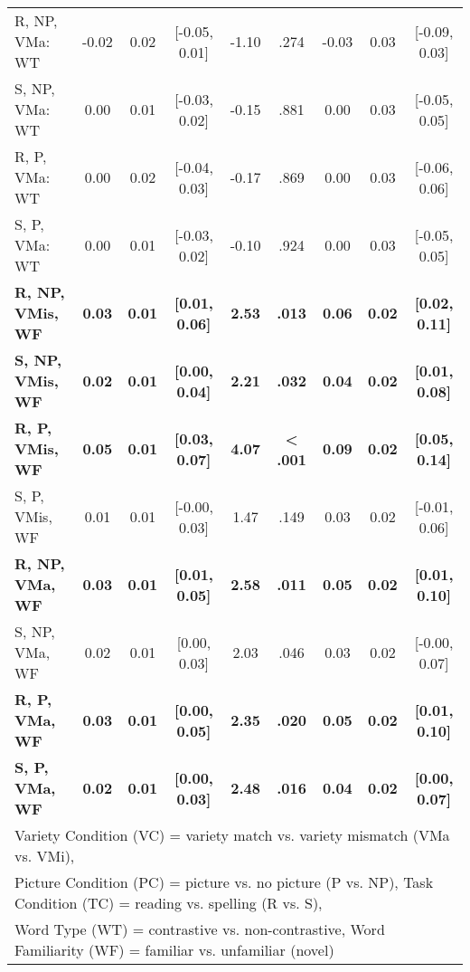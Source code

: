 \documentclass[doc,floatsintext]{apa6}
\begin{document}
\begin{table}[!h]
{\begin{tabular}{lcccccccc}
R, NP, VMa: WT & -0.02 & 0.02 & [-0.05, 0.01] & -1.10 & .274 & -0.03 & 0.03 & [-0.09, 0.03]\\
S, NP, VMa: WT & 0.00 & 0.01 & [-0.03, 0.02] & -0.15 & .881 & 0.00 & 0.03 & [-0.05, 0.05]\\
R, P, VMa: WT & 0.00 & 0.02 & [-0.04, 0.03] & -0.17 & .869 & 0.00 & 0.03 & [-0.06, 0.06]\\
S, P, VMa: WT & 0.00 & 0.01 & [-0.03, 0.02] & -0.10 & .924 & 0.00 & 0.03 & [-0.05, 0.05]\\
\textbf{R, NP, VMis, WF} & \textbf{0.03} & \textbf{0.01} & \textbf{[0.01, 0.06]} & \textbf{2.53} & \textbf{.013} & \textbf{0.06} & \textbf{0.02} & \textbf{[0.02, 0.11]}\\
\textbf{S, NP, VMis, WF} & \textbf{0.02} & \textbf{0.01} & \textbf{[0.00, 0.04]} & \textbf{2.21} & \textbf{.032} & \textbf{0.04} & \textbf{0.02} & \textbf{[0.01, 0.08]}\\
\textbf{R, P, VMis, WF} & \textbf{0.05} & \textbf{0.01} & \textbf{[0.03, 0.07]} & \textbf{4.07} & \textbf{< .001} & \textbf{0.09} & \textbf{0.02} & \textbf{[0.05, 0.14]}\\
S, P, VMis, WF & 0.01 & 0.01 & [-0.00, 0.03] & 1.47 & .149 & 0.03 & 0.02 & [-0.01, 0.06]\\
\textbf{R, NP, VMa, WF} & \textbf{0.03} & \textbf{0.01} & \textbf{[0.01, 0.05]} & \textbf{2.58} & \textbf{.011} & \textbf{0.05} & \textbf{0.02} & \textbf{[0.01, 0.10]}\\
S, NP, VMa, WF & 0.02 & 0.01 & [0.00, 0.03] & 2.03 & .046 & 0.03 & 0.02 & [-0.00, 0.07]\\
\textbf{R, P, VMa, WF} & \textbf{0.03} & \textbf{0.01} & \textbf{[0.00, 0.05]} & \textbf{2.35} & \textbf{.020} & \textbf{0.05} & \textbf{0.02} & \textbf{[0.01, 0.10]}\\
\textbf{S, P, VMa, WF} & \textbf{0.02} & \textbf{0.01} & \textbf{[0.00, 0.03]} & \textbf{2.48} & \textbf{.016} & \textbf{0.04} & \textbf{0.02} & \textbf{[0.00, 0.07]}\\
\bottomrule
\multicolumn{9}{l}{Variety Condition (VC) = variety match vs. variety mismatch (VMa vs. VMi),}\\
\multicolumn{9}{l}{Picture Condition (PC) = picture vs. no picture (P vs. NP), Task Condition (TC) = reading vs. spelling (R vs. S),}\\
\multicolumn{9}{l}{Word Type (WT) = contrastive vs. non-contrastive, Word Familiarity (WF) = familiar vs. unfamiliar (novel)}\\
\end{tabular}}
\end{table}
\end{document}
